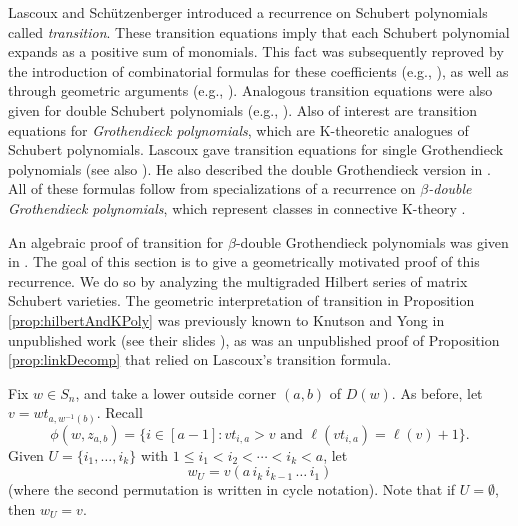 \documentclass[12pt,reqno]{amsart}
\newtheorem{Main Conjecture}[theorem]{Main Conjecture}
\theoremstyle{remark}
\theoremstyle{plain}
\newcommand{\notdefterm}[1]{\emph{#1}}
\begin{document}
Lascoux and Sch\"utzenberger \cite{LS85}  introduced a recurrence on Schubert polynomials called \emph{transition}.  These transition equations imply that each Schubert polynomial expands as a positive sum of monomials.  This fact was subsequently reproved by the introduction of combinatorial formulas for these coefficients (e.g., \cite{BJS93,FS94}), as well as through  geometric arguments (e.g., \cite{KM00,Kog00,BS02,KM05}). Analogous transition equations were also given for double Schubert polynomials  (e.g., \cite{KV97}). Also of interest are transition equations for \notdefterm{Grothendieck polynomials}, which are K-theoretic analogues of Schubert polynomials.  Lascoux \cite{Las01} gave transition equations for single Grothendieck polynomials (see also \cite{Len03}). He also described the double Grothendieck version in \cite{Las}.  All of these formulas follow from specializations of a recurrence on \notdefterm{$\beta$-double Grothendieck polynomials}, which represent classes in connective K-theory \cite{Hud14}. 

An algebraic proof of transition for $\beta$-double Grothendieck polynomials was given in \cite[Appendix~A]{Wei21}.  
The goal of this section is to give a geometrically motivated proof of this recurrence.  
We do so by analyzing the multigraded Hilbert series of matrix Schubert varieties.   The geometric interpretation of transition in Proposition \ref{prop:hilbertAndKPoly} was previously known to Knutson and Yong in unpublished work (see their slides \cite{YSlides}), as was an unpublished proof of Proposition \ref{prop:linkDecomp} that relied on Lascoux's transition formula. 


Fix $w\in S_n$, and take a lower outside corner $(a,b)$ of $D(w)$.  As before, let $v=wt_{a,w^{-1}(b)}$.  Recall \[
 \phi(w,z_{a,b})=\{i\in [a-1]:vt_{i,a}>v \text{ and } \ell(vt_{i,a})=\ell(v)+1\}.
 \] Given $U=\{i_1,\ldots,i_k\}$ with $1\leq i_1<i_2<\cdots <i_k<a$, let \[w_U= v (a\, i_k \,i_{k-1}\, \ldots\, i_1)\] (where the second permutation is written in cycle notation).  Note that if $U=\emptyset$, then $w_U=v$.
\end{document}
